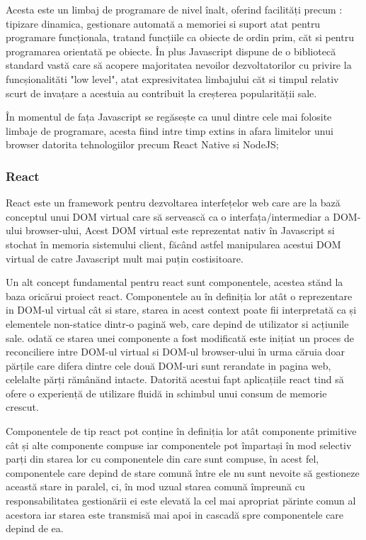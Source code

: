 \documentclass[12pt,a4paper,hidelinks]{report}
\theoremstyle{definition}
\theoremstyle{remark}
\begin{document}
Acesta este un limbaj de programare de nivel înalt, oferind facilități precum : tipizare dinamica, gestionare automată
a memoriei si suport atat pentru programare funcționala, tratand funcțiile ca obiecte de ordin prim,
căt si pentru programarea orientată pe obiecte. În plus Javascript dispune de o bibliotecă standard vastă care să acopere
majoritatea nevoilor dezvoltatorilor cu privire la funcșionalităti "low level", atat expresivitatea limbajului
căt si timpul relativ scurt de invațare a acestuia au contribuit la creșterea popularității sale.

În momentul de fața Javascript se regăsește ca unul dintre cele mai folosite limbaje de programare,
acesta fiind intre timp extins in afara limitelor unui browser datorita tehnologiilor precum React Native si NodeJS;

\subsubsection{React}
React este un framework pentru dezvoltarea interfețelor web
care are la bază conceptul unui DOM virtual care să servească ca o interfața/intermediar a DOM-ului browser-ului,
Acest DOM virtual este reprezentat nativ în Javascript si stochat în memoria sistemului client, făcând astfel
manipularea acestui DOM virtual de catre Javascript mult mai puțin costisitoare.

Un alt concept fundamental pentru react sunt componentele, acestea stănd la baza oricărui proiect react.
Componentele au în definiția lor atât o reprezentare in DOM-ul virtual cât si stare, starea in acest context
poate fii interpretată ca și elementele non-statice dintr-o pagină web, care depind de utilizator si acțiunile sale.
odată ce starea unei componente a fost modificată este inițiat un proces de reconciliere intre  DOM-ul virtual si DOM-ul
browser-ului în urma căruia doar părțile care difera dintre cele două DOM-uri sunt rerandate in pagina web, celelalte părți 
rămânănd intacte. Datorită acestui fapt aplicațiile react tind să ofere o experiență de utilizare fluidă in schimbul
unui consum de memorie crescut.

Componentele de tip react pot conține în definiția lor atât componente primitive cât
și alte componente compuse iar componentele pot împartași în mod selectiv parți din starea lor cu componentele
din care sunt compuse, în acest fel, componentele care depind de stare comună între ele nu sunt nevoite să
gestioneze această stare in paralel, ci, în mod uzual starea comună împreună cu responsabilitatea gestionării ei 
este elevată la cel mai apropriat părinte comun al acestora iar starea este transmisă mai apoi in cascadă spre componentele care depind de ea. 
\end{document}
